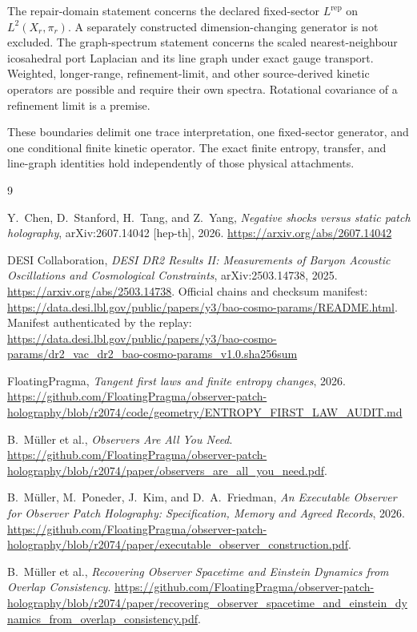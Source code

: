 \documentclass[11pt]{article}
\theoremstyle{remark}
\begin{document}
The repair-domain statement concerns the declared fixed-sector
\(L^{\mathrm{rep}}\) on \(L^2(X_r,\pi_r)\). A separately constructed
dimension-changing generator is not excluded. The graph-spectrum statement
concerns the scaled nearest-neighbour icosahedral port Laplacian and its line
graph under exact gauge transport. Weighted, longer-range, refinement-limit,
and other source-derived kinetic operators are possible and require their
own spectra. Rotational covariance of a refinement limit is a premise.

These boundaries delimit one trace interpretation, one fixed-sector
generator, and one conditional finite kinetic operator. The exact finite
entropy, transfer, and line-graph identities hold independently of those
physical attachments.

\begin{thebibliography}{9}

Y.~Chen, D.~Stanford, H.~Tang, and Z.~Yang,
\emph{Negative shocks versus static patch holography},
arXiv:2607.14042 [hep-th], 2026.
\url{https://arxiv.org/abs/2607.14042}

DESI Collaboration,
\emph{DESI DR2 Results II: Measurements of Baryon Acoustic Oscillations and
Cosmological Constraints}, arXiv:2503.14738, 2025.
\url{https://arxiv.org/abs/2503.14738}. Official chains and checksum manifest:
\url{https://data.desi.lbl.gov/public/papers/y3/bao-cosmo-params/README.html}.
Manifest authenticated by the replay:
\url{https://data.desi.lbl.gov/public/papers/y3/bao-cosmo-params/dr2_vac_dr2_bao-cosmo-params_v1.0.sha256sum}

FloatingPragma,
\emph{Tangent first laws and finite entropy changes}, 2026.
\url{https://github.com/FloatingPragma/observer-patch-holography/blob/r2074/code/geometry/ENTROPY_FIRST_LAW_AUDIT.md}

B.~M\"uller et al., \emph{Observers Are All You Need}.
\url{https://github.com/FloatingPragma/observer-patch-holography/blob/r2074/paper/observers_are_all_you_need.pdf}.

B.~M\"uller, M.~Poneder, J.~Kim, and D.~A.~Friedman,
\emph{An Executable Observer for Observer Patch Holography: Specification,
Memory and Agreed Records}, 2026.
\url{https://github.com/FloatingPragma/observer-patch-holography/blob/r2074/paper/executable_observer_construction.pdf}.

B.~M\"uller et al., \emph{Recovering Observer Spacetime and Einstein Dynamics from Overlap Consistency}.
\url{https://github.com/FloatingPragma/observer-patch-holography/blob/r2074/paper/recovering_observer_spacetime_and_einstein_dynamics_from_overlap_consistency.pdf}.


\end{thebibliography}
\end{document}
